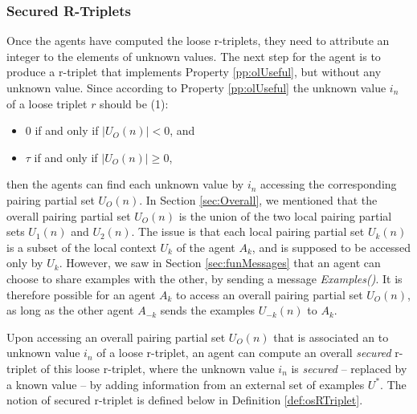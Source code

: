 \subsubsection{Secured R-Triplets}

Once the agents have computed the loose r-triplets, they need to attribute an integer to the elements of unknown values. The next step for the agent is to produce a r-triplet that implements Property \ref{pp:olUseful}, but without any unknown value. Since according to Property \ref{pp:olUseful} the unknown value $i_{n}$ of a loose triplet $r$ should be (1):

\begin{itemize}
    \item 0 if and only if $|U_{O}(n)| < 0$, and
    \item $\tau$ if and only if $|U_{O}(n)| \geq 0$,
\end{itemize}

then the agents can find each unknown value by $i_{n}$ accessing the corresponding pairing partial set $U_{O}(n)$. In Section \ref{sec:Overall}, we mentioned that the overall pairing partial set $U_{O}(n)$ is the union of the two local pairing partial sets $U_{1}(n)$ and $U_{2}(n)$. The issue is that each local pairing partial set $U_{k}(n)$ is a subset of the local context $U_{k}$ of the agent $A_{k}$, and is supposed to be accessed only by $U_{k}$. However, we saw in Section \ref{sec:funMessages} that an agent can choose to share examples with the other, by sending a message \emph{Examples()}. It is therefore possible for an agent $A_{k}$ to access an overall pairing partial set $U_{O}(n)$, as long as the other agent $A_{-k}$ sends the examples $U_{-k}(n)$ to $A_{k}$.

Upon accessing an overall pairing partial set $U_{O}(n)$ that is associated an to unknown value $i_{n}$ of a loose r-triplet, an agent can compute an overall \emph{secured} r-triplet of this loose r-triplet, where the unknown value $i_{n}$ is \emph{secured} -- replaced by a known value -- by adding information from an external set of examples $U^{*}$. The notion of secured r-triplet is defined below in Definition \ref{def:osRTriplet}.

